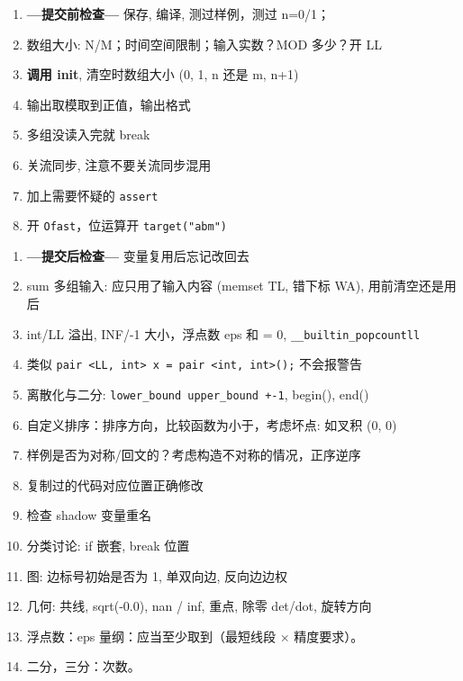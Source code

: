 \begin{enumerate}[leftmargin=1mm]
	\setlength{\itemsep}{0pt}
	\setlength{\parskip}{0.5pt}
\item \textbf{\large ---提交前检查---} 保存, 编译, 测过样例，测过 n=0/1；
\item 数组大小: N/M；时间空间限制；输入实数？MOD 多少？开 LL
\item \textbf{调用 \large{init}}, 清空时数组大小 (0, 1, n 还是 m, n+1)
\item 输出取模取到正值，输出格式
\item 多组没读入完就 break
\item 关流同步, 注意不要关流同步混用
\item 加上需要怀疑的 \texttt{assert}
\item 开 \texttt{Ofast}，位运算开 \texttt{target("abm")}
\end{enumerate}
\begin{enumerate}[leftmargin=1mm]
\setlength{\itemsep}{0pt}
\setlength{\parskip}{0.5pt}
\item \textbf{\large ---提交后检查---} 变量复用后忘记改回去
\item sum 多组输入: 应只用了输入内容 (memset TL, 错下标 WA), 用前清空还是用后
\item int/LL 溢出, INF/-1 大小，浮点数 eps 和 = 0, \texttt{\_\_builtin\_popcount\large{ll}}
\item 类似 \texttt{pair <LL, int> x = pair <int, int>();} 不会报警告 
\item 离散化与二分: \texttt{lower\_bound upper\_bound +-1}, begin(), end()
\item 自定义排序：排序方向，比较函数为小于，考虑坏点: 如叉积 (0, 0)
\item 样例是否为对称/回文的？考虑构造不对称的情况，正序逆序
\item 复制过的代码对应位置正确修改
\item 检查 shadow 变量重名
\item 分类讨论: if 嵌套, break 位置
\item 图: 边标号初始是否为 1, 单双向边, 反向边边权
\item 几何: 共线, sqrt(-0.0), nan / inf, 重点, 除零 det/dot, 旋转方向
\item 浮点数：eps 量纲：应当至少取到（最短线段 $\times$ 精度要求）。
\item 二分，三分：次数。
\end{enumerate}
